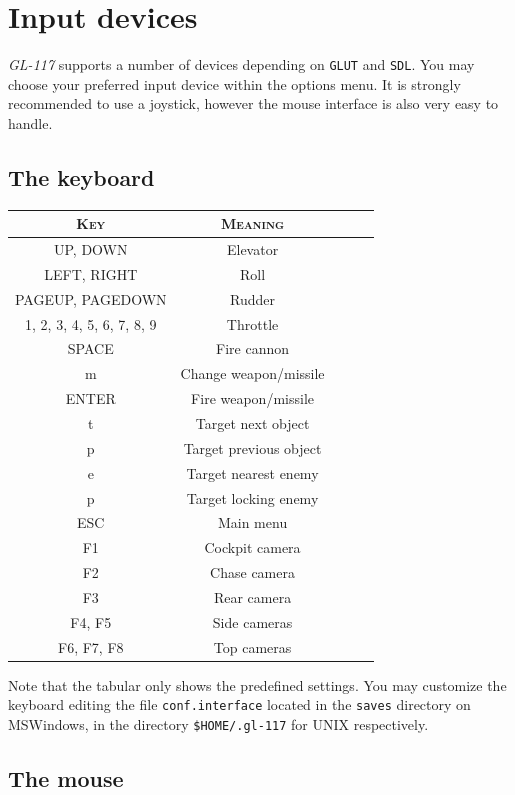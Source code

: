 \section{Input devices}
\label{sec:input_devices}

\emph{GL-117} supports a number of devices depending on \texttt{GLUT} and \texttt{SDL}.
You may choose your preferred input device within the options menu.
It is strongly recommended to use a joystick, however the mouse interface
is also very easy to handle.

\subsection{The keyboard}
\label{subsec:keyboard}

\begin{center}
\begin{tabular}{|c|c|l|l|l|}
\hline
\textsc{Key} & \textsc{Meaning}\\\hline
UP, DOWN & Elevator\\
LEFT, RIGHT & Roll\\
PAGEUP, PAGEDOWN & Rudder\\
1, 2, 3, 4, 5, 6, 7, 8, 9 & Throttle\\
\hline
SPACE & Fire cannon\\
m & Change weapon/missile\\
ENTER & Fire weapon/missile\\
\hline
t & Target next object\\
p & Target previous object\\
e & Target nearest enemy\\
p & Target locking enemy\\
\hline
ESC & Main menu\\
\hline
F1 & Cockpit camera\\
F2 & Chase camera\\
F3 & Rear camera\\
F4, F5 & Side cameras\\
F6, F7, F8 & Top cameras\\
\hline
\end{tabular}
\end{center}

Note that the tabular only shows the predefined settings. You may customize the
keyboard editing the file \texttt{conf.interface} located in the \texttt{saves}
directory on MSWindows, in the directory \texttt{\$HOME/.gl-117} for UNIX respectively.


\subsection{The mouse}
\label{subsec:mouse}

